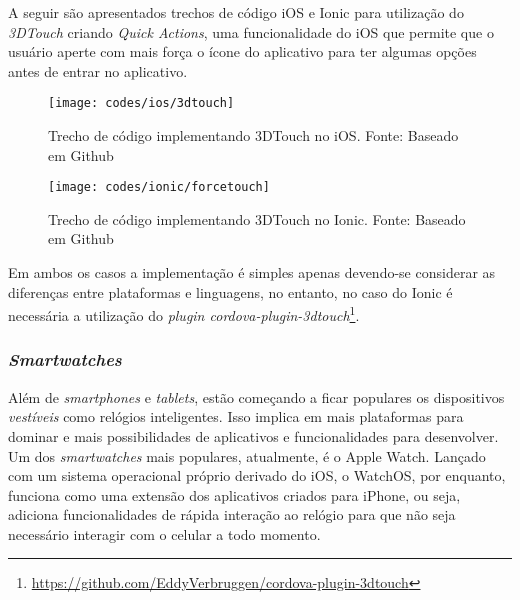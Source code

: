 A seguir são apresentados trechos de código iOS e Ionic para utilização do \textit{3DTouch} criando \textit{Quick Actions}, uma funcionalidade do iOS que permite que o usuário aperte com mais força o ícone do aplicativo 
para ter algumas opções antes de entrar no aplicativo.

\begin{figure}[H]
	\centering
	\texttt{[image: codes/ios/3dtouch]}
	\caption[Trecho de código implementando 3DTouch no iOS.]{Trecho de código implementando 3DTouch no iOS. Fonte: Baseado em Github\protect\footnotemark}
	\label{fig:3dtouch-ios}
\end{figure}


\begin{figure}[H]
	\centering
	\texttt{[image: codes/ionic/forcetouch]}
	\caption[Trecho de código implementando 3DTouch no Ionic]{Trecho de código implementando 3DTouch no Ionic. Fonte: Baseado em Github\protect\footnotemark}
	\label{fig:forcetouch-ionic}
\end{figure}


Em ambos os casos a implementação é simples apenas devendo-se considerar as diferenças entre plataformas e linguagens, no entanto, no caso do Ionic é necessária a utilização do 
\textit{plugin cordova-plugin-3dtouch}\footnote{\url{https://github.com/EddyVerbruggen/cordova-plugin-3dtouch}}.

\subsubsection{\textit{Smartwatches}} \label{subsubsec:facial} 

Além de \textit{smartphones} e \textit{tablets}, estão começando a ficar populares os dispositivos \textit{vestíveis} como relógios inteligentes. Isso implica em mais plataformas para dominar 
e mais possibilidades de aplicativos e funcionalidades para desenvolver. Um dos \textit{smartwatches} mais populares, atualmente, é o Apple Watch. Lançado com um sistema operacional próprio derivado do iOS, o WatchOS, 
por enquanto, funciona como uma extensão dos aplicativos criados para iPhone, ou seja, adiciona funcionalidades de rápida interação ao relógio para que não seja necessário interagir com o celular a todo momento.


